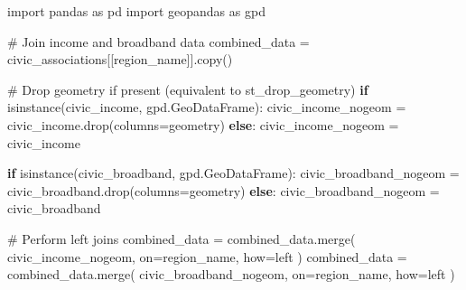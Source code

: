 \documentclass[
  letterpaper,
  DIV=11,
  numbers=noendperiod]{scrartcl}
\newenvironment{Shaded}{\begin{snugshade}}{\end{snugshade}}
\newcommand{\BuiltInTok}[1]{\textcolor[rgb]{0.00,0.23,0.31}{#1}}
\newcommand{\CommentTok}[1]{\textcolor[rgb]{0.37,0.37,0.37}{#1}}
\newcommand{\ControlFlowTok}[1]{\textcolor[rgb]{0.00,0.23,0.31}{\textbf{#1}}}
\newcommand{\ImportTok}[1]{\textcolor[rgb]{0.00,0.46,0.62}{#1}}
\newcommand{\NormalTok}[1]{\textcolor[rgb]{0.00,0.23,0.31}{#1}}
\newcommand{\OperatorTok}[1]{\textcolor[rgb]{0.37,0.37,0.37}{#1}}
\newcommand{\StringTok}[1]{\textcolor[rgb]{0.13,0.47,0.30}{#1}}
\begin{document}
\begin{Shaded}
\begin{Highlighting}[]
\ImportTok{import}\NormalTok{ pandas }\ImportTok{as}\NormalTok{ pd}
\ImportTok{import}\NormalTok{ geopandas }\ImportTok{as}\NormalTok{ gpd}

\CommentTok{\# Join income and broadband data}
\NormalTok{combined\_data }\OperatorTok{=}\NormalTok{ civic\_associations[[}\StringTok{\textquotesingle{}region\_name\textquotesingle{}}\NormalTok{]].copy()}

\CommentTok{\# Drop geometry if present (equivalent to st\_drop\_geometry)}
\ControlFlowTok{if} \BuiltInTok{isinstance}\NormalTok{(civic\_income, gpd.GeoDataFrame):}
\NormalTok{    civic\_income\_nogeom }\OperatorTok{=}\NormalTok{ civic\_income.drop(columns}\OperatorTok{=}\StringTok{\textquotesingle{}geometry\textquotesingle{}}\NormalTok{)}
\ControlFlowTok{else}\NormalTok{:}
\NormalTok{    civic\_income\_nogeom }\OperatorTok{=}\NormalTok{ civic\_income}

\ControlFlowTok{if} \BuiltInTok{isinstance}\NormalTok{(civic\_broadband, gpd.GeoDataFrame):}
\NormalTok{    civic\_broadband\_nogeom }\OperatorTok{=}\NormalTok{ civic\_broadband.drop(columns}\OperatorTok{=}\StringTok{\textquotesingle{}geometry\textquotesingle{}}\NormalTok{)}
\ControlFlowTok{else}\NormalTok{:}
\NormalTok{    civic\_broadband\_nogeom }\OperatorTok{=}\NormalTok{ civic\_broadband}

\CommentTok{\# Perform left joins}
\NormalTok{combined\_data }\OperatorTok{=}\NormalTok{ combined\_data.merge(}
\NormalTok{    civic\_income\_nogeom, on}\OperatorTok{=}\StringTok{\textquotesingle{}region\_name\textquotesingle{}}\NormalTok{, how}\OperatorTok{=}\StringTok{\textquotesingle{}left\textquotesingle{}}
\NormalTok{)}
\NormalTok{combined\_data }\OperatorTok{=}\NormalTok{ combined\_data.merge(}
\NormalTok{    civic\_broadband\_nogeom, on}\OperatorTok{=}\StringTok{\textquotesingle{}region\_name\textquotesingle{}}\NormalTok{, how}\OperatorTok{=}\StringTok{\textquotesingle{}left\textquotesingle{}}
\NormalTok{)}


\end{Highlighting}
\end{Shaded}
\end{document}
